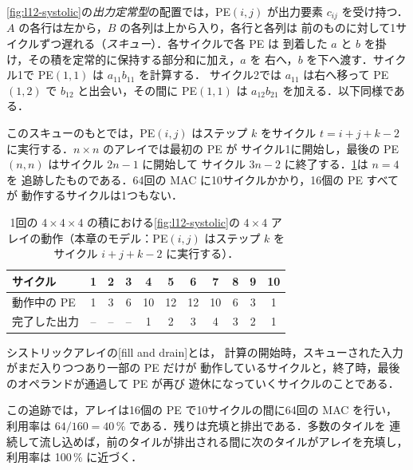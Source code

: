 \documentclass[../main.tex]{subfiles}
\begin{document}
\cref{fig:l12-systolic}の\emph{出力定常型}の配置では，PE$(i,j)$ が出力要素
$c_{ij}$ を受け持つ．$A$ の各行は左から，$B$ の各列は上から入り，各行と各列は
前のものに対して1サイクルずつ遅れる（\emph{スキュー}）．各サイクルで各 PE は
到着した $a$ と $b$ を掛け，その積を定常的に保持する部分和に加え，$a$ を
右へ，$b$ を下へ渡す．サイクル1で PE$(1,1)$ は $a_{11} b_{11}$ を計算する．
サイクル2では $a_{11}$ は右へ移って PE$(1,2)$ で $b_{12}$ と出会い，その間に
PE$(1,1)$ は $a_{12} b_{21}$ を加える．以下同様である．

このスキューのもとでは，PE$(i,j)$ はステップ $k$ をサイクル
$t = i + j + k - 2$ に実行する．$n \times n$ のアレイでは最初の PE が
サイクル1に開始し，最後の PE$(n,n)$ はサイクル $2n - 1$ に開始して
サイクル $3n - 2$ に終了する．\cref{tab:l12-systolic-trace}は $n = 4$ を
追跡したものである．64回の MAC に10サイクルかかり，16個の PE すべてが
動作するサイクルは1つもない．

\begin{table}[htbp]
  \centering
  \caption{1回の $4 \times 4 \times 4$ の積における\cref{fig:l12-systolic}の
    $4 \times 4$ アレイの動作（本章のモデル：PE$(i,j)$ はステップ $k$ を
    サイクル $i + j + k - 2$ に実行する）．}
  \label{tab:l12-systolic-trace}
  \begin{tabular}{lcccccccccc}
    \toprule
    サイクル & 1 & 2 & 3 & 4 & 5 & 6 & 7 & 8 & 9 & 10 \\
    \midrule
    動作中の PE & 1 & 3 & 6 & 10 & 12 & 12 & 10 & 6 & 3 & 1 \\
    完了した出力 & -- & -- & -- & 1 & 2 & 3 & 4 & 3 & 2 & 1 \\
    \bottomrule
  \end{tabular}
\end{table}

\begin{definition}[充填と排出]
  シストリックアレイの[fill and drain]とは，
  計算の開始時，スキューされた入力がまだ入りつつあり一部の PE だけが
  動作しているサイクルと，終了時，最後のオペランドが通過して PE が再び
  遊休になっていくサイクルのことである．
\end{definition}

この追跡では，アレイは16個の PE で10サイクルの間に64回の MAC を行い，
利用率は $64/160 = 40\,\%$ である．残りは充填と排出である．多数のタイルを
連続して流し込めば，前のタイルが排出される間に次のタイルがアレイを充填し，
利用率は 100\,\% に近づく．
\end{document}
